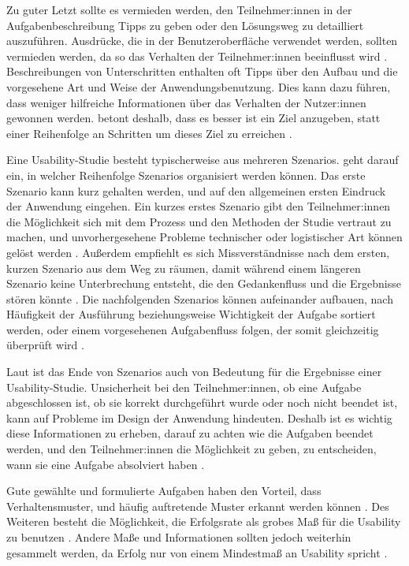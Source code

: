 Zu guter Letzt sollte es vermieden werden, den Teilnehmer:innen in der Aufgabenbeschreibung Tipps zu geben oder den Lösungsweg zu detailliert auszuführen. Ausdrücke, die in der Benutzeroberfläche verwendet werden, sollten vermieden werden, da so das Verhalten der Teilnehmer:innen beeinflusst wird \parencite{mccloskeyTaskScenarios2014, barnumUsabilityTesting2021}. Beschreibungen von Unterschritten enthalten oft Tipps über den Aufbau und die vorgesehene Art und Weise der Anwendungsbenutzung. Dies kann dazu führen, dass weniger hilfreiche Informationen über das Verhalten der Nutzer:innen gewonnen werden. \textcite{barnumUsabilityTesting2021} betont deshalb, dass es besser ist ein Ziel anzugeben, statt einer Reihenfolge an Schritten um dieses Ziel zu erreichen \parencite{mccloskeyTaskScenarios2014}.

Eine Usability-Studie besteht typischerweise aus mehreren Szenarios. \textcite{barnumUsabilityTesting2021} geht darauf ein, in welcher Reihenfolge Szenarios organisiert werden können. Das erste Szenario kann kurz gehalten werden, und auf den allgemeinen ersten Eindruck der Anwendung eingehen. Ein kurzes erstes Szenario gibt den Teilnehmer:innen die Möglichkeit sich mit dem Prozess und den Methoden der Studie vertraut zu machen, und unvorhergesehene Probleme technischer oder logistischer Art können gelöst werden \parencite{barnumUsabilityTesting2021}. Außerdem empfiehlt es sich Missverständnisse nach dem ersten, kurzen Szenario aus dem Weg zu räumen, damit während einem längeren Szenario keine Unterbrechung entsteht, die den Gedankenfluss und die Ergebnisse stören könnte \parencite{barnumUsabilityTesting2021}. Die nachfolgenden Szenarios können aufeinander aufbauen, nach Häufigkeit der Ausführung beziehungsweise Wichtigkeit der Aufgabe sortiert werden, oder einem vorgesehenen Aufgabenfluss folgen, der somit gleichzeitig überprüft wird \parencite{barnumUsabilityTesting2021}.

Laut \textcite{barnumUsabilityTesting2021} ist das Ende von Szenarios auch von Bedeutung für die Ergebnisse einer Usability-Studie. Unsicherheit bei den Teilnehmer:innen, ob eine Aufgabe abgeschlossen ist, ob sie korrekt durchgeführt wurde oder noch nicht beendet ist, kann auf Probleme im Design der Anwendung hindeuten. Deshalb ist es wichtig diese Informationen zu erheben, darauf zu achten wie die Aufgaben beendet werden, und den Teilnehmer:innen die Möglichkeit zu geben, zu entscheiden, wann sie eine Aufgabe absolviert haben \parencite{barnumUsabilityTesting2021}.

Gute gewählte und formulierte Aufgaben haben den Vorteil, dass Verhaltensmuster, und häufig auftretende Muster erkannt werden können \parencite{barnumUsabilityTesting2021}. Des Weiteren besteht die Möglichkeit, die Erfolgsrate als grobes Maß für die Usability zu benutzen \parencite{nielsenSuccessRate2001}. Andere Maße und Informationen sollten jedoch weiterhin gesammelt werden, da Erfolg nur von einem Mindestmaß an Usability spricht \parencite{nielsenSuccessRate2001}.
